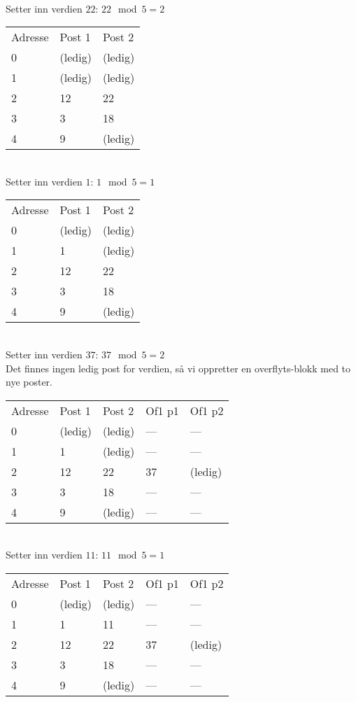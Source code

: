 ~\\
Setter inn verdien $22$: $22 \mod 5 = 2$\\
\begin{tabular}{|l|l|l|}
    \hline
    Adresse & Post 1 & Post 2 \\
    0       & (ledig)& (ledig)\\
    1       & (ledig)& (ledig)\\
    2       & 12     & 22     \\
    3       & 3      & 18     \\
    4       & 9      & (ledig)\\ \hline
\end{tabular}

~\\
Setter inn verdien $1$: $1 \mod 5 = 1$\\
\begin{tabular}{|l|l|l|}
    \hline
    Adresse & Post 1 & Post 2 \\
    0       & (ledig)& (ledig)\\
    1       & 1      & (ledig)\\
    2       & 12     & 22     \\
    3       & 3      & 18     \\
    4       & 9      & (ledig)\\ \hline
\end{tabular}

~\\
Setter inn verdien $37$: $37 \mod 5 = 2$\\
Det finnes ingen ledig post for verdien, så vi oppretter en overflyts-blokk med to nye poster.\\
\begin{tabular}{|l|l|l|l|l|}
    \hline
    Adresse & Post 1 & Post 2 & Of1 p1 & Of1 p2 \\
    0       & (ledig)& (ledig)& ---   & ---   \\
    1       & 1      & (ledig)& ---   & ---   \\
    2       & 12     & 22     & 37     & (ledig)\\
    3       & 3      & 18     & ---   & ---   \\
    4       & 9      & (ledig)& ---   & ---   \\ \hline
\end{tabular}

~\\
Setter inn verdien $11$: $11 \mod 5 = 1$\\
\begin{tabular}{|l|l|l|l|l|}
    \hline
    Adresse & Post 1 & Post 2 & Of1 p1 & Of1 p2 \\
    0       & (ledig)& (ledig)& ---   & ---   \\
    1       & 1      & 11     & ---   & ---   \\
    2       & 12     & 22     & 37     & (ledig)\\
    3       & 3      & 18     & ---   & ---   \\
    4       & 9      & (ledig)& ---   & ---   \\ \hline
\end{tabular}

